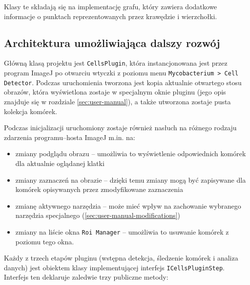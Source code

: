 \documentclass[declaration,shortabstract,mgr]{iithesis}
\begin{document}
Klasy te składają się na implementację grafu, który zawiera dodatkowe informacje o punktach reprezentowanych przez krawędzie i wierzchołki.

\subsection{Architektura umożliwiająca dalszy rozwój}
\label{sec:architecture}

Główną klasą projektu jest \texttt{CellsPlugin}, która instancjonowana jest przez program ImageJ po otwarciu wtyczki z poziomu menu \texttt{Mycobacterium > Cell Detector}.
Podczas uruchomienia tworzona jest kopia aktualnie otwartego stosu obrazów, która wyświetlona zostaje w specjalnym oknie pluginu (jego opis znajduje się w rozdziale \ref{sec:user-manual}), a także utworzona zostaje pusta kolekcja komórek.

Podczas inicjalizacji uruchomiony zostaje również nasłuch na różnego rodzaju zdarzenia programu--hosta ImageJ m.in. na:
\begin{itemize}
  \item zmiany podglądu obrazu -- umożliwia to wyświetlenie odpowiednich komórek dla aktualnie oglądanej klatki
  \item zmiany zaznaczeń na obrazie -- dzięki temu zmiany mogą być zapisywane dla komórek opisywanych przez zmodyfikowane zaznaczenia
  \item zmianę aktywnego narzędzia -- może mieć wpływ na zachowanie wybranego narzędzia specjalnego (\ref{sec:user-manual-modifications})
  \item zmiany na liście okna \texttt{Roi Manager} -- umożliwia to usuwanie komórek z poziomu tego okna.
\end{itemize}

Każdy z trzech etapów pluginu (wstępna detekcja, śledzenie komórek i analiza danych) jest obiektem klasy implementującej interfejs \texttt{ICellsPluginStep}.
Interfejs ten deklaruje zaledwie trzy publiczne metody:
\end{document}
